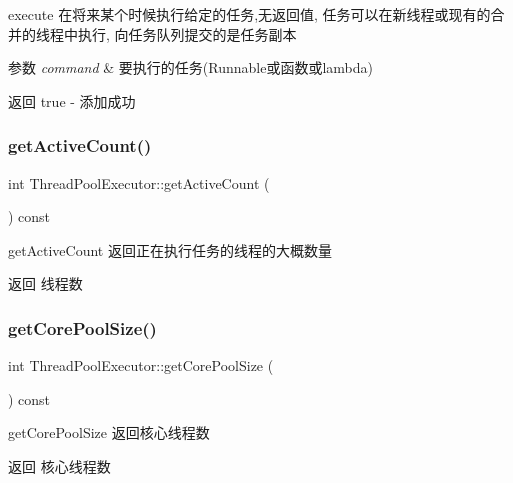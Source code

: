 execute 在将来某个时候执行给定的任务,无返回值, 任务可以在新线程或现有的合并的线程中执行, 向任务队列提交的是任务副本 


\begin{DoxyParams}{参数}
{\em command} & 要执行的任务(Runnable或函数或lambda)\\
\hline
\end{DoxyParams}
\begin{DoxyReturn}{返回}
true -\/ 添加成功 
\end{DoxyReturn}
\mbox{\label{classThreadPoolExecutor_a1a4a5262dc8db7933c27dbbc267d4825}} 
\subsubsection{\texorpdfstring{get\+Active\+Count()}{getActiveCount()}}
{\footnotesize\ttfamily int Thread\+Pool\+Executor\+::get\+Active\+Count (\begin{DoxyParamCaption}{ }\end{DoxyParamCaption}) const}



get\+Active\+Count 返回正在执行任务的线程的大概数量 

\begin{DoxyReturn}{返回}
线程数 
\end{DoxyReturn}
\mbox{\label{classThreadPoolExecutor_a9099318ba5cab5dd05f219babba4b6b7}} 
\subsubsection{\texorpdfstring{get\+Core\+Pool\+Size()}{getCorePoolSize()}}
{\footnotesize\ttfamily int Thread\+Pool\+Executor\+::get\+Core\+Pool\+Size (\begin{DoxyParamCaption}{ }\end{DoxyParamCaption}) const}



get\+Core\+Pool\+Size 返回核心线程数 

\begin{DoxyReturn}{返回}
核心线程数 
\end{DoxyReturn}
\mbox{\label{classThreadPoolExecutor_aeb35f2475788af6b98d1ca1bf8d05536}} 
